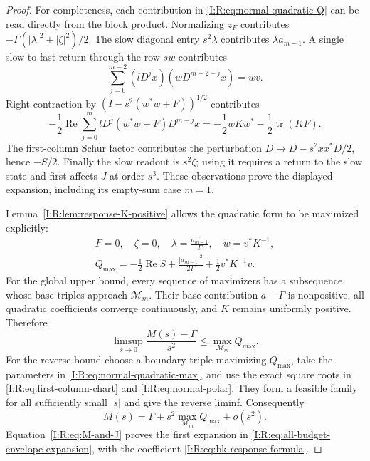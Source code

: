 \begin{proof}
For completeness, each contribution in
\eqref{I:R:eq:normal-quadratic-Q} can be read directly from the block
product.  Normalizing $z_F$ contributes
$-\Gamma(|\lambda|^2+|\zeta|^2)/2$.  The slow diagonal entry
$s^2\lambda$ contributes $\lambda a_{m-1}$.  A single slow-to-fast return
through the row $sw$ contributes
\[
 \sum_{j=0}^{m-2}(lD^jx)(wD^{m-2-j}x)=wv.
\]
Right contraction by $(I-s^2(w^*w+F))^{1/2}$ contributes
\[
 -\frac12\operatorname{Re}\sum_{j=0}^{m}
 lD^j(w^*w+F)D^{m-j}x
 =-\frac12wKw^*-\frac12\operatorname{tr}(KF).
\]
The first-column Schur factor contributes the perturbation
$D\mapsto D-s^2xx^*D/2$, hence $-S/2$.  Finally the slow readout is
$s^2\zeta$; using it requires a return to the slow state and first affects
$J$ at order $s^3$.  These observations prove the displayed expansion,
including its empty-sum case $m=1$.

Lemma~\ref{I:R:lem:response-K-positive} allows the quadratic form to be
maximized explicitly:
\begin{equation}
 \begin{gathered}
 F=0,\quad\zeta=0,\quad
 \lambda=\frac{\overline{a_{m-1}}}{\Gamma},\quad w=v^*K^{-1},\\
 Q_{\max}=-\frac12\operatorname{Re}S
       +\frac{|a_{m-1}|^2}{2\Gamma}+\frac12v^*K^{-1}v.
 \end{gathered}
 \label{I:R:eq:normal-quadratic-max}
\end{equation}
For the global upper bound, every sequence of maximizers has a
subsequence whose base triples approach $\mathcal M_m$.  Their base
contribution $a-\Gamma$ is nonpositive, all quadratic coefficients
converge continuously, and $K$ remains uniformly positive.  Therefore
\[
 \limsup_{s\to0}\frac{M(s)-\Gamma}{s^2}
 \le\max_{\mathcal M_m}Q_{\max}.
\]
For the reverse bound choose a boundary triple maximizing
$Q_{\max}$, take the parameters in
\eqref{I:R:eq:normal-quadratic-max}, and use the exact square roots in
\eqref{I:R:eq:first-column-chart} and \eqref{I:R:eq:normal-polar}.
They form a feasible family for all sufficiently small $|s|$ and give
the reverse liminf.  Consequently
\[
 M(s)=\Gamma+s^2\max_{\mathcal M_m}Q_{\max}+o(s^2).
\]
Equation~\eqref{I:R:eq:M-and-J} proves the first expansion in
\eqref{I:R:eq:all-budget-envelope-expansion}, with the coefficient
\eqref{I:R:eq:bk-response-formula}.


\end{proof}
